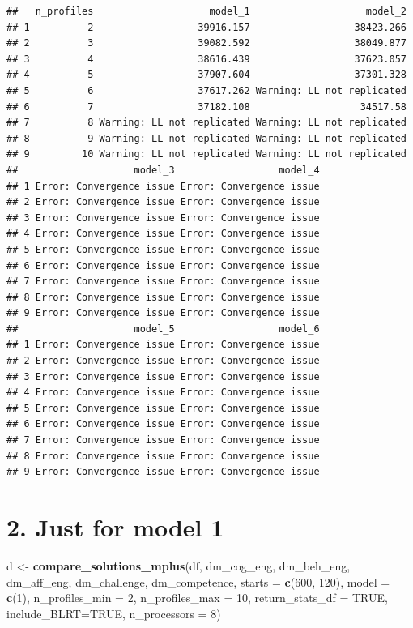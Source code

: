 \documentclass[]{book}
\newenvironment{Shaded}{\begin{snugshade}}{\end{snugshade}}
\newcommand{\KeywordTok}[1]{\textcolor[rgb]{0.13,0.29,0.53}{\textbf{#1}}}
\newcommand{\DataTypeTok}[1]{\textcolor[rgb]{0.13,0.29,0.53}{#1}}
\newcommand{\DecValTok}[1]{\textcolor[rgb]{0.00,0.00,0.81}{#1}}
\newcommand{\StringTok}[1]{\textcolor[rgb]{0.31,0.60,0.02}{#1}}
\newcommand{\OtherTok}[1]{\textcolor[rgb]{0.56,0.35,0.01}{#1}}
\newcommand{\NormalTok}[1]{#1}
\begin{document}
\begin{verbatim}
##   n_profiles                    model_1                    model_2
## 1          2                  39916.157                  38423.266
## 2          3                  39082.592                  38049.877
## 3          4                  38616.439                  37623.057
## 4          5                  37907.604                  37301.328
## 5          6                  37617.262 Warning: LL not replicated
## 6          7                  37182.108                   34517.58
## 7          8 Warning: LL not replicated Warning: LL not replicated
## 8          9 Warning: LL not replicated Warning: LL not replicated
## 9         10 Warning: LL not replicated Warning: LL not replicated
##                    model_3                  model_4
## 1 Error: Convergence issue Error: Convergence issue
## 2 Error: Convergence issue Error: Convergence issue
## 3 Error: Convergence issue Error: Convergence issue
## 4 Error: Convergence issue Error: Convergence issue
## 5 Error: Convergence issue Error: Convergence issue
## 6 Error: Convergence issue Error: Convergence issue
## 7 Error: Convergence issue Error: Convergence issue
## 8 Error: Convergence issue Error: Convergence issue
## 9 Error: Convergence issue Error: Convergence issue
##                    model_5                  model_6
## 1 Error: Convergence issue Error: Convergence issue
## 2 Error: Convergence issue Error: Convergence issue
## 3 Error: Convergence issue Error: Convergence issue
## 4 Error: Convergence issue Error: Convergence issue
## 5 Error: Convergence issue Error: Convergence issue
## 6 Error: Convergence issue Error: Convergence issue
## 7 Error: Convergence issue Error: Convergence issue
## 8 Error: Convergence issue Error: Convergence issue
## 9 Error: Convergence issue Error: Convergence issue
\end{verbatim}

\section{2. Just for model 1}\label{just-for-model-1}

\begin{Shaded}
\begin{Highlighting}[]
\NormalTok{d <-}\StringTok{ }\KeywordTok{compare_solutions_mplus}\NormalTok{(df,  }
\NormalTok{                             dm_cog_eng, dm_beh_eng, dm_aff_eng, dm_challenge, dm_competence,}
                             \DataTypeTok{starts =} \KeywordTok{c}\NormalTok{(}\DecValTok{600}\NormalTok{, }\DecValTok{120}\NormalTok{),}
                             \DataTypeTok{model =} \KeywordTok{c}\NormalTok{(}\DecValTok{1}\NormalTok{),}
                             \DataTypeTok{n_profiles_min =} \DecValTok{2}\NormalTok{, }
                             \DataTypeTok{n_profiles_max =} \DecValTok{10}\NormalTok{,}
                             \DataTypeTok{return_stats_df =} \OtherTok{TRUE}\NormalTok{,}
                             \DataTypeTok{include_BLRT=}\OtherTok{TRUE}\NormalTok{,}
                             \DataTypeTok{n_processors =} \DecValTok{8}\NormalTok{)}
\end{Highlighting}
\end{Shaded}
\end{document}
